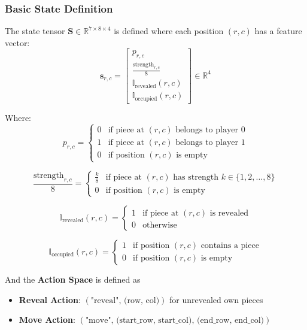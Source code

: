 \documentclass{article}
\begin{document}
\subsubsection{Basic State Definition}
The state tensor $\mathbf{S} \in \mathbb{R}^{7 \times 8 \times 4}$ is defined where each position $(r,c)$ has a feature vector:
$$ \mathbf{s}_{r,c} = \begin{bmatrix}
p_{r,c} \\
\frac{\text{strength}_{r,c}}{8} \\
\mathbb{I}_{\text{revealed}}(r,c) \\
\mathbb{I}_{\text{occupied}}(r,c)
\end{bmatrix} \in \mathbb{R}^4 $$

Where:
$$ p_{r,c} = \begin{cases}
0 & \text{if piece at }(r,c)\text{ belongs to player 0} \\
1 & \text{if piece at }(r,c)\text{ belongs to player 1} \\
0 & \text{if position }(r,c)\text{ is empty}
\end{cases} $$

$$ \frac{\text{strength}_{r,c}}{8} = \begin{cases}
\frac{k}{8} & \text{if piece at }(r,c)\text{ has strength }k \in \{1,2,\ldots,8\} \\
0 & \text{if position }(r,c)\text{ is empty}
\end{cases} $$

$$ \mathbb{I}_{\text{revealed}}(r,c) = \begin{cases}
1 & \text{if piece at }(r,c)\text{ is revealed} \\
0 & \text{otherwise}
\end{cases} $$

$$ \mathbb{I}_{\text{occupied}}(r,c) = \begin{cases}
1 & \text{if position }(r,c)\text{ contains a piece} \\
0 & \text{if position }(r,c)\text{ is empty}
\end{cases} $$

And the \textbf{Action Space} is defined as
\begin{itemize}
    \item \textbf{Reveal Action}: $(\text{"reveal", (row, col)})$ for unrevealed own pieces
    \item \textbf{Move Action}: $(\text{"move", (start\_row, start\_col), (end\_row, end\_col)})$
\end{itemize}
\end{document}
